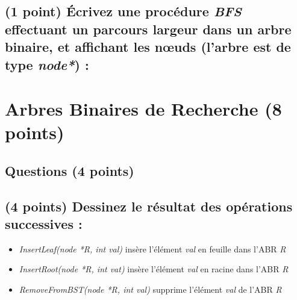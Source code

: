 \documentclass[11pt,a4paper]{article}
\begin{document}
\begin{center}
\end{center}


\subsection{(1 point) \'Ecrivez une procédure \og \textit{BFS} \fg{} effectuant un parcours largeur dans un arbre binaire, et affichant les nœuds (l'arbre est de type \textit{node*}) : }

\begin{center}
\end{center}


\clearpage


\section{Arbres Binaires de Recherche (8 points)}

\subsection*{Questions (4 points) }

\subsection{(4 points) Dessinez le résultat des opérations successives : }

\begin{itemize}
\item \textit{InsertLeaf(node *R, int val)} insère l'élément \og \textit{val} \fg{} en feuille dans l'ABR \og \textit{R} \fg{}
\item \textit{InsertRoot(node *R, int vat)} insère l'élément \og \textit{val} \fg{} en racine dans l'ABR \og \textit{R} \fg{}
\item \textit{RemoveFromBST(node *R, int val)} supprime l'élément \og \textit{val} \fg{} de l'ABR \og \textit{R} \fg{}
\end{itemize}

\vspace*{-0.5cm}
\end{document}
